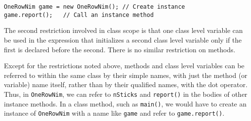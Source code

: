 \begin{jjjlisting}
\begin{lstlisting}
OneRowNim game = new OneRowNim(); // Create instance
game.report();   // Call an instance method
\end{lstlisting}
\end{jjjlisting}

\noindent The second restriction involved in class scope is
that one class level variable can be used in the expression that
initializes a second class level variable only if the first is
declared before the second.  There is no similar restriction on
methods.


Except for the restrictions noted above, methods and class level
variables can be referred to within the same class by their simple
names, with just the method (or variable) name itself,
rather than by their qualified names, with the dot operator.  Thus, in
{\tt OneRowNim}, we can refer to {\tt nSticks} and {\tt report()}
in the bodies of other instance methods. In a class method, such as
{\tt main()}, we would have to create an instance of {\tt OneRowNim}
with a name like {\tt game} and refer to {\tt game.report()}.



